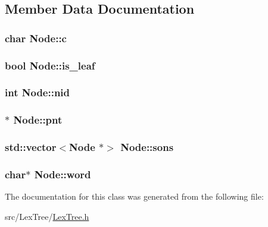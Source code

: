 \subsection{Member Data Documentation}
\hypertarget{class_node_a61aff5c2aea5a34a609ffcbdb88fde6f}{
\subsubsection[{c}]{\setlength{\rightskip}{0pt plus 5cm}char Node\+::c\hspace{0.3cm}{\ttfamily [private]}}}\label{class_node_a61aff5c2aea5a34a609ffcbdb88fde6f}
\hypertarget{class_node_a3e5449ec9e41ba98cbaf8f3a993d03c4}{
\subsubsection[{is\+\_\+leaf}]{\setlength{\rightskip}{0pt plus 5cm}bool Node\+::is\+\_\+leaf\hspace{0.3cm}{\ttfamily [private]}}}\label{class_node_a3e5449ec9e41ba98cbaf8f3a993d03c4}
\hypertarget{class_node_a7282da2b6b3eebdb62b36d416c68b8f4}{
\subsubsection[{nid}]{\setlength{\rightskip}{0pt plus 5cm}int Node\+::nid\hspace{0.3cm}{\ttfamily [private]}}}\label{class_node_a7282da2b6b3eebdb62b36d416c68b8f4}
\hypertarget{class_node_a205e65c58cfc162fa74ffcf9e887471f}{
\subsubsection[{pnt}]{$\ast$ Node\+::pnt\hspace{0.3cm}{\ttfamily [private]}}}\label{class_node_a205e65c58cfc162fa74ffcf9e887471f}
\hypertarget{class_node_a07c804c43704f42d46ff0434bebd811a}{
\subsubsection[{sons}]{\setlength{\rightskip}{0pt plus 5cm}std\+::vector$<${\bf Node} $\ast$$>$ Node\+::sons\hspace{0.3cm}{\ttfamily [private]}}}\label{class_node_a07c804c43704f42d46ff0434bebd811a}
\hypertarget{class_node_afa6ccc6414d3e0bcacb715dcdf764bca}{
\subsubsection[{word}]{\setlength{\rightskip}{0pt plus 5cm}char$\ast$ Node\+::word\hspace{0.3cm}{\ttfamily [private]}}}\label{class_node_afa6ccc6414d3e0bcacb715dcdf764bca}


The documentation for this class was generated from the following file\+:\begin{DoxyCompactItemize}
\item 
src/\+Lex\+Tree/\hyperlink{_lex_tree_8h}{Lex\+Tree.\+h}\end{DoxyCompactItemize}

